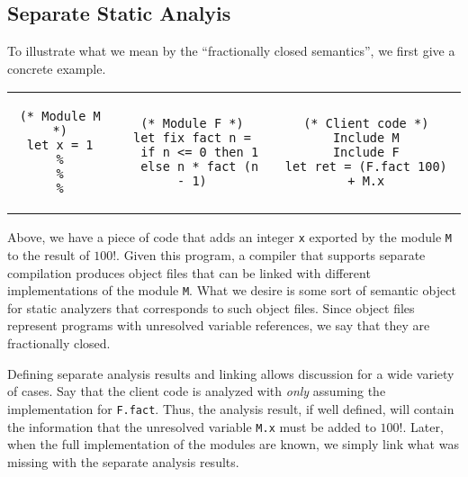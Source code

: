 \documentclass[acmsmall,review]{acmart}\settopmatter{printfolios=true,printccs=false,printacmref=false}
\theoremstyle{definition}
\theoremstyle{plain}
\begin{document}
\subsection{Separate Static Analyis}
To illustrate what we mean by the ``fractionally closed semantics'', we first give a concrete example.
\begin{center}
  \begin{tabular}{ccc}
    \begin{minipage}{0.3\linewidth}
      \begin{lstlisting}[language=Coq]
(* Module M *)
let x = 1
%
%
%
    \end{lstlisting}
    \end{minipage} &
    \begin{minipage}{0.3\linewidth}
      \begin{lstlisting}[language=Coq]
(* Module F *)
let fix fact n =
  if n <= 0 then 1
  else n * fact (n - 1)
    \end{lstlisting}
    \end{minipage}      &
    \begin{minipage}{0.3\linewidth}
      \begin{lstlisting}[language=Coq]
(* Client code *)
Include M
Include F
let ret = (F.fact 100) + M.x
    \end{lstlisting}
    \end{minipage}
  \end{tabular}
\end{center}

Above, we have a piece of code that adds an integer \texttt{x} exported by the module \texttt{M} to the result of $100!$.
Given this program, a compiler that supports separate compilation produces object files that can be linked with different implementations of the module \texttt{M}.
What we desire is some sort of semantic object for static analyzers that corresponds to such object files.
Since object files represent programs with unresolved variable references, we say that they are fractionally closed.

Defining separate analysis results and linking allows discussion for a wide variety of cases.
Say that the client code is analyzed with \emph{only} assuming the implementation for \texttt{F.fact}.
Thus, the analysis result, if well defined, will contain the information that the unresolved variable \texttt{M.x} must be added to $100!$.
Later, when the full implementation of the modules are known, we simply link what was missing with the separate analysis results.
\end{document}
